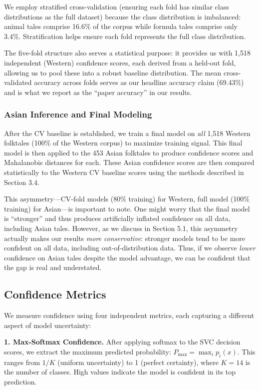 \documentclass{article}
\begin{document}
We employ stratified cross-validation (ensuring each fold has similar class distributions as the full dataset) because the class distribution is imbalanced: animal tales comprise 16.6\% of the corpus while formula tales comprise only 3.4\%. Stratification helps ensure each fold represents the full class distribution.

The five-fold structure also serves a statistical purpose: it provides us with 1,518 independent (Western) confidence scores, each derived from a held-out fold, allowing us to pool these into a robust baseline distribution. The mean cross-validated accuracy across folds serves as our headline accuracy claim (69.43\%) and is what we report as the ``paper accuracy'' in our results.

\subsubsection{Asian Inference and Final Modeling}

After the CV baseline is established, we train a final model on \textit{all} 1,518 Western folktales (100\% of the Western corpus) to maximize training signal. This final model is then applied to the 453 Asian folktales to produce confidence scores and Mahalanobis distances for each. These Asian confidence scores are then compared statistically to the Western CV baseline scores using the methods described in Section 3.4.

This asymmetry---CV-fold models (80\% training) for Western, full model (100\% training) for Asian---is important to note. One might worry that the final model is ``stronger'' and thus produces artificially inflated confidence on all data, including Asian tales. However, as we discuss in Section 5.1, this asymmetry actually makes our results \textit{more conservative}: stronger models tend to be more confident on all data, including out-of-distribution data. Thus, if we observe \textit{lower} confidence on Asian tales despite the model advantage, we can be confident that the gap is real and understated.

\subsection{Confidence Metrics}

We measure confidence using four independent metrics, each capturing a different aspect of model uncertainty:

\textbf{1. Max-Softmax Confidence.} After applying softmax to the SVC decision scores, we extract the maximum predicted probability: $P_{\max} = \max_i p_i(x)$. This ranges from $1/K$ (uniform uncertainty) to 1 (perfect certainty), where $K=14$ is the number of classes. High values indicate the model is confident in its top prediction.
\end{document}
